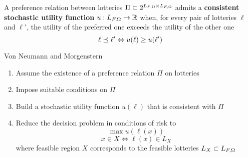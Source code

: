 \begin{definition}
	A preference relation between lotteries $\Pi \subset 2^{L_{F, \Omega} \times L_{F, \Omega}}$ admits a \textbf{consistent stochastic utility function} $u: L_{F, \Omega} \rightarrow \operatorname{\mathbb{R}}$ when, for every pair of lotteries $\ell$ and $\ell'$, the utility of the preferred one exceeds the utility of the other one
	$$ \ell \preceq_{} \ell' \Leftrightarrow u(\ell) \geq u(\ell') $$
\end{definition}

Von Neumann and Morgenstern
\begin{enumerate}
	\item Assume the existence of a preference relation $\Pi$ on lotteries
	
	\item Impose suitable conditions on $\Pi$
	
	\item Build a stochastic utility function $u(\ell)$ that is consistent with $\Pi$
	
	\item Reduce the decision problem in conditions of risk to
	$$ \max u(\ell (x)) $$
	$$ x \in X \Leftrightarrow \ell (x) \in L_X $$
	where feasible region $X$ corresponds to the feasible lotteries $L_X \subset L_{F, \Omega}$
\end{enumerate}

